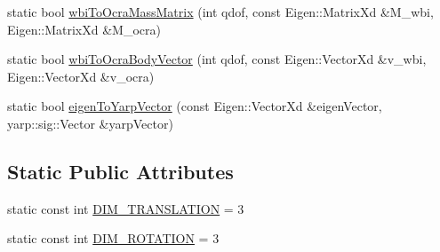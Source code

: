 \begin{DoxyCompactItemize}
\item 
static bool \hyperlink{classocra__icub_1_1OcraWbiConversions_abaa2b7a9069b60cfb36cb21e89b98177}{wbi\-To\-Ocra\-Mass\-Matrix} (int qdof, const \-Eigen\-::\-Matrix\-Xd \&\-M\-\_\-wbi, \-Eigen\-::\-Matrix\-Xd \&\-M\-\_\-ocra)
\item 
static bool \hyperlink{classocra__icub_1_1OcraWbiConversions_ae8839dfdc97e2239f4ed8a257d32fb21}{wbi\-To\-Ocra\-Body\-Vector} (int qdof, const \-Eigen\-::\-Vector\-Xd \&v\-\_\-wbi, \-Eigen\-::\-Vector\-Xd \&v\-\_\-ocra)
\item 
static bool \hyperlink{classocra__icub_1_1OcraWbiConversions_a1197be5b35329fbec85de8ee3c4abbd5}{eigen\-To\-Yarp\-Vector} (const \-Eigen\-::\-Vector\-Xd \&eigen\-Vector, yarp\-::sig\-::\-Vector \&yarp\-Vector)
\end{DoxyCompactItemize}
\subsection*{\-Static \-Public \-Attributes}
\begin{DoxyCompactItemize}
\item 
static const int \hyperlink{classocra__icub_1_1OcraWbiConversions_a7c628bd1208c5e70be458d4dffda4d06}{\-D\-I\-M\-\_\-\-T\-R\-A\-N\-S\-L\-A\-T\-I\-O\-N} = 3
\item 
static const int \hyperlink{classocra__icub_1_1OcraWbiConversions_a05e66392df58e9dda2d4db590bdd65a0}{\-D\-I\-M\-\_\-\-R\-O\-T\-A\-T\-I\-O\-N} = 3
\end{DoxyCompactItemize}


